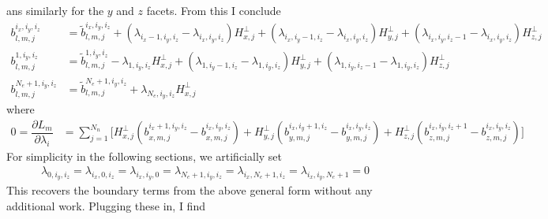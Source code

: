 \documentclass[12pt,a4paper]{article}
\newcommand{\pder}[2][]{\dfrac{\partial #1}{\partial #2}} %
\begin{document}
ans similarly for the $y$ and $z$ facets. From this I conclude
\begin{align*}
b_{l,m,j}^{i_x,i_y,i_z}  &=  \tilde{b}^{i_x,i_y,i_z}_{l,m,j}  + \left( \lambda_{i_x-1,i_y,i_z} -  \lambda_{i_x,i_y,i_z} \right) H_{x , j}^\bot + \left( \lambda_{i_x,i_y-1,i_z}  -  \lambda_{i_x,i_y,i_z} \right) H_{y , j}^\bot + \left( \lambda_{i_x,i_y,i_z-1} -  \lambda_{i_x,i_y,i_z} \right) H_{z , j}^\bot \\
b_{l,m,j}^{1,i_y,i_z}  &=  \tilde{b}^{1,i_y,i_z}_{l,m,j}  - \lambda_{1,i_y,i_z} H_{x , j}^\bot + \left( \lambda_{1,i_y-1,i_z}  -  \lambda_{1,i_y,i_z} \right) H_{y , j}^\bot + \left( \lambda_{1,i_y,i_z-1} -  \lambda_{1,i_y,i_z} \right) H_{z , j}^\bot \\
b_{l,m,j}^{N_e+1,i_y,i_z}  &=  \tilde{b}^{N_e+1,i_y,i_z}_{l,m,j}  + \lambda_{N_e,i_y,i_z} H_{x , j}^\bot 
\end{align*}
where
\begin{align*}
0 = \pder[L_m]{\lambda_i} &= \sum_{j=1}^{N_n} \Big[ H^\bot_{x,j} \left( b_{x,m,j}^{i_x+1,i_y,i_z} - b_{x,m,j}^{i_x,i_y,i_z} \right) + H^\bot_{y,j} \left( b_{y,m,j}^{i_x,i_y+1,i_z} - b_{y,m,j}^{i_x,i_y,i_z} \right) + H^\bot_{z,j} \left( b_{z,m,j}^{i_x,i_y,i_z+1} - b_{z,m,j}^{i_x,i_y,i_z} \right) \Big]
\end{align*}
For simplicity in the following sections, we artificially set 
\begin{align*}
 \lambda_{0,i_y,i_z} =  \lambda_{i_x,0,i_z} =  \lambda_{i_x,i_y,0} =   \lambda_{N_e+1,i_y,i_z} =  \lambda_{i_x,N_e+1,i_z} =  \lambda_{i_x,i_y,N_e+1} = 0
\end{align*}
This recovers the boundary terms from the above general form without any additional work. Plugging these in, I find
\end{document}
